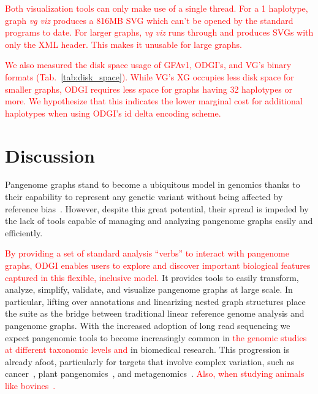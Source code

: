 \documentclass{bioinfo}
\newcommand{\REVIEWED}[1]{{\textcolor{Red}{#1}}}
\begin{document}
\REVIEWED{Both visualization tools can only make use of a single thread.
For a 1 haplotype, graph \textit{vg viz} produces a 816MB SVG which can't be opened by the standard programs to date.
For larger graphs, \textit{vg viz} runs through and produces SVGs with only the XML header. This makes it unusable for large graphs.}

\REVIEWED{We also measured the disk space usage of GFAv1, ODGI's, and VG's binary formats (Tab.~\ref{tab:disk_space}).
While VG's XG occupies less disk space for smaller graphs, ODGI requires less space for graphs having 32 haplotypes or more.
We hypothesize that this indicates the lower marginal cost for additional haplotypes when using ODGI's id delta encoding scheme. }




%




\section{Discussion}
Pangenome graphs stand to become a ubiquitous model in genomics thanks to their capability to represent any genetic variant without being affected by reference bias~\citep{Eizenga_2020}.
However, despite this great potential, their spread is impeded by the lack of tools capable of managing and analyzing pangenome graphs easily and efficiently.

\REVIEWED{By providing a set of standard analysis ``verbs'' to interact with pangenome graphs, ODGI enables users to explore and discover important biological features captured in this flexible, inclusive model.}
It provides tools to easily transform, analyze, simplify, validate, and visualize pangenome graphs at large scale.
In particular, lifting over annotations and linearizing nested graph structures place the suite as the bridge between traditional linear reference genome analysis and pangenome graphs.
With the increased adoption of long read sequencing we expect pangenomic tools to become increasingly common in \REVIEWED{the genomic studies at different taxonomic levels and} in biomedical research.
This progression is already afoot, particularly for targets that involve complex variation, such as cancer\REVIEWED{~\citep{CompPan2016}}, plant pangenomics\REVIEWED{~\citep{Bayer2020, Liu2020, Qin2021, Li2022, Bayer2022}}, and metagenomics\REVIEWED{~\citep{Zhong2021}}. \REVIEWED{Also, when studying animals like bovines~\citep{Leonard2021, Talenti2022, BPC}.}
\end{document}
